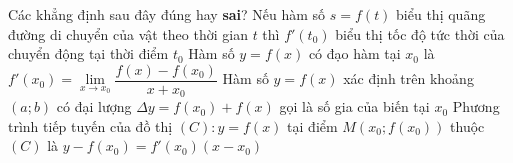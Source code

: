 



\begin{ex}%
 Các khẳng định sau đây  đúng hay \textbf{sai}?
  \choiceTF
  {\True Nếu hàm số $s=f(t)$ biểu thị quãng đường di chuyển của vật theo thời gian $t$ thì $f'(t_0)$ biểu thị tốc  độ tức thời của chuyển động tại thời điểm $t_0$}
  {Hàm số $y=f(x)$ có đạo hàm tại $x_0$  là $f'(x_0)=\lim\limits_{x\to x_0}\dfrac{f(x)-f(x_0)}{x+x_0}$}
  {Hàm số $y=f(x)$ xác định trên khoảng $(a;b)$ có đại lượng $\Delta y=f(x_0)+f(x)$ gọi là số gia của biến tại $x_0$} 
  {\True Phương trình tiếp tuyến của đồ thị $(C): y=f(x)$ tại điểm $M(x_0;f(x_0))$  thuộc $(C)$ là $y-f(x_0)=f'(x_0)(x-x_0)$}
\end{ex}

